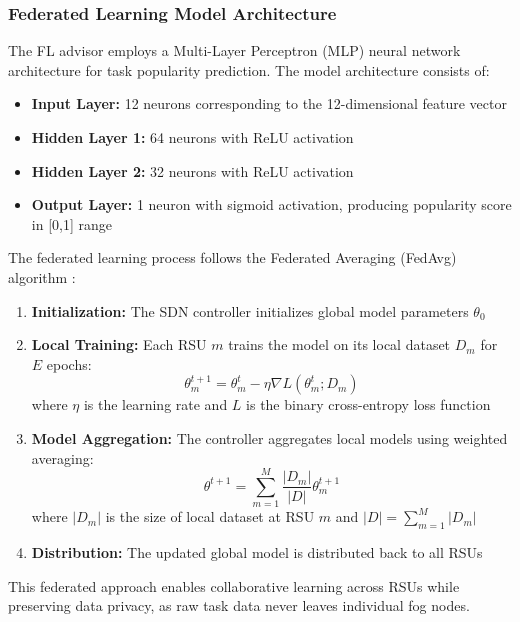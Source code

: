 \subsubsection{Federated Learning Model Architecture}

The FL advisor employs a Multi-Layer Perceptron (MLP) neural network architecture for task popularity prediction. The model architecture consists of:

\begin{itemize}
    \item \textbf{Input Layer:} 12 neurons corresponding to the 12-dimensional feature vector
    \item \textbf{Hidden Layer 1:} 64 neurons with ReLU activation
    \item \textbf{Hidden Layer 2:} 32 neurons with ReLU activation
    \item \textbf{Output Layer:} 1 neuron with sigmoid activation, producing popularity score in [0,1] range
\end{itemize}

The federated learning process follows the Federated Averaging (FedAvg) algorithm \cite{mcmahan2017communication}:

\begin{enumerate}
    \item \textbf{Initialization:} The SDN controller initializes global model parameters $\theta_0$
    \item \textbf{Local Training:} Each RSU $m$ trains the model on its local dataset $D_m$ for $E$ epochs:
    \begin{equation}
        \theta_m^{t+1} = \theta_m^t - \eta \nabla L(\theta_m^t; D_m)
    \end{equation}
    where $\eta$ is the learning rate and $L$ is the binary cross-entropy loss function
    \item \textbf{Model Aggregation:} The controller aggregates local models using weighted averaging:
    \begin{equation}
        \theta^{t+1} = \sum_{m=1}^{M} \frac{|D_m|}{|D|} \theta_m^{t+1}
    \end{equation}
    where $|D_m|$ is the size of local dataset at RSU $m$ and $|D| = \sum_{m=1}^{M} |D_m|$
    \item \textbf{Distribution:} The updated global model is distributed back to all RSUs
\end{enumerate}

This federated approach enables collaborative learning across RSUs while preserving data privacy, as raw task data never leaves individual fog nodes.

